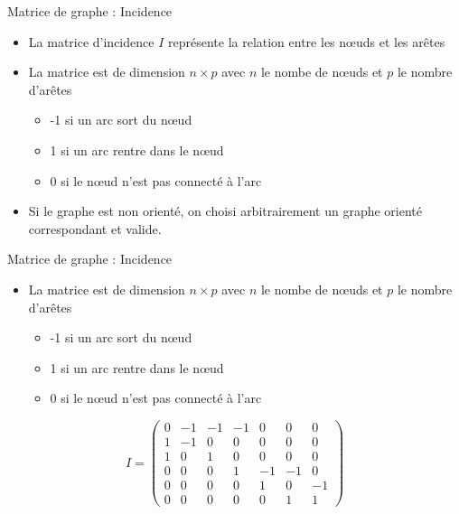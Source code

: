\begin{frame}{Matrice de graphe : Incidence}
    \begin{minipage}{0.49\linewidth}
        \begin{itemize}
            \item La \alert{matrice d'incidence} $I$ représente la relation entre les nœuds et les arêtes
            \item La matrice est de dimension $n \times p$ avec $n$ le nombe de nœuds et $p$ le nombre d'arêtes
            \begin{itemize}
                \item -1 si un arc sort du nœud
                \item 1 si un arc rentre dans le nœud
                \item 0 si le nœud n'est pas connecté à l'arc
            \end{itemize}
            \item Si le graphe est non orienté, on choisi arbitrairement un graphe orienté correspondant et valide.
        \end{itemize}
    \end{minipage}
    \begin{minipage}{0.49\linewidth}
    \end{minipage}
\end{frame}

\begin{frame}{Matrice de graphe : Incidence}
    \begin{minipage}{0.49\linewidth}
        \begin{itemize}
            \item La matrice est de dimension $n \times p$ avec $n$ le nombe de nœuds et $p$ le nombre d'arêtes
            \begin{itemize}
                \item -1 si un arc sort du nœud
                \item 1 si un arc rentre dans le nœud
                \item 0 si le nœud n'est pas connecté à l'arc
            \end{itemize}
        \end{itemize}
        \scriptsize{
        $$
        I = \begin{pmatrix}
            0 & -1 & -1 & -1 & 0 & 0 & 0\\
            1 & -1 & 0 & 0 & 0 & 0 & 0\\
            1 & 0 & 1 & 0 & 0 & 0 & 0\\
            0 & 0 & 0 & 1 & -1 & -1 & 0\\
            0 & 0 & 0 & 0 & 1 & 0 & -1\\
            0 & 0 & 0 & 0 & 0 & 1 & 1
        \end{pmatrix}
        $$}
    \end{minipage}
    \begin{minipage}{0.49\linewidth}
    \end{minipage}
\end{frame}

